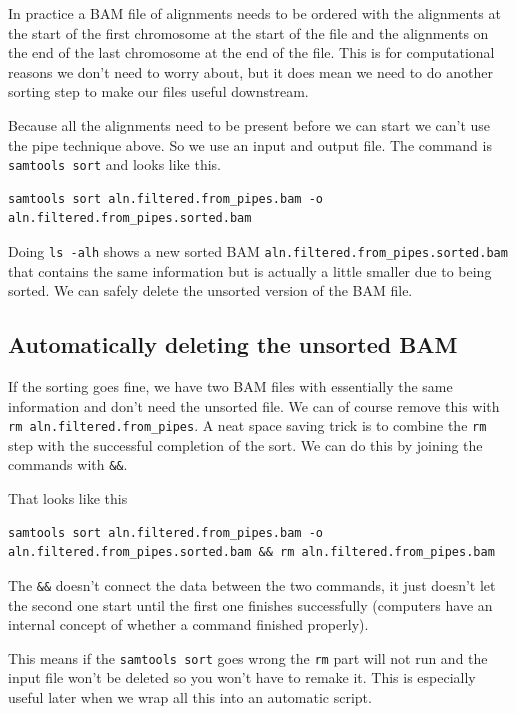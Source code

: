 \documentclass[]{book}
\begin{document}
In practice a BAM file of alignments needs to be ordered with the alignments at the start of the first chromosome at the start of the file and the alignments on the end of the last chromosome at the end of the file. This is for computational reasons we don't need to worry about, but it does mean we need to do another sorting step to make our files useful downstream.

Because all the alignments need to be present before we can start we can't use the pipe technique above. So we use an input and output file. The command is \texttt{samtools\ sort} and looks like this.

\begin{verbatim}
samtools sort aln.filtered.from_pipes.bam -o aln.filtered.from_pipes.sorted.bam
\end{verbatim}

Doing \texttt{ls\ -alh} shows a new sorted BAM \texttt{aln.filtered.from\_pipes.sorted.bam} that contains the same information but is actually a little smaller due to being sorted. We can safely delete the unsorted version of the BAM file.

\hypertarget{automatically-deleting-the-unsorted-bam}{%
\subsection{Automatically deleting the unsorted BAM}\label{automatically-deleting-the-unsorted-bam}}

If the sorting goes fine, we have two BAM files with essentially the same information and don't need the unsorted file. We can of course remove this with \texttt{rm\ aln.filtered.from\_pipes}. A neat space saving trick is to combine the \texttt{rm} step with the successful completion of the sort. We can do this by joining the commands with \texttt{\&\&}.

That looks like this

\begin{verbatim}
samtools sort aln.filtered.from_pipes.bam -o aln.filtered.from_pipes.sorted.bam && rm aln.filtered.from_pipes.bam
\end{verbatim}

The \texttt{\&\&} doesn't connect the data between the two commands, it just doesn't let the second one start until the first one finishes successfully (computers have an internal concept of whether a command finished properly).

This means if the \texttt{samtools\ sort} goes wrong the \texttt{rm} part will not run and the input file won't be deleted so you won't have to remake it. This is especially useful later when we wrap all this into an automatic script.
\end{document}
